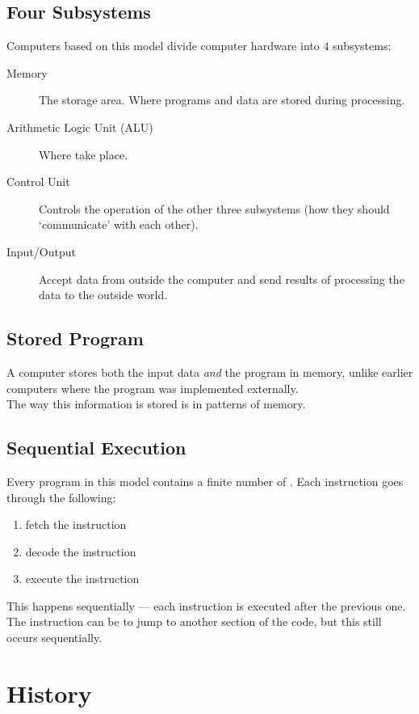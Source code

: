 \documentclass[../notes.tex]{subfiles}
\begin{document}
			\subsection{Four Subsystems}
				Computers based on this model divide computer hardware into $4$ subsystems:
				\begin{description}
					\item[Memory] The storage area. Where programs and data are stored during processing. 
					\item[Arithmetic Logic Unit (ALU)] Where  take place.
					\item[Control Unit] Controls the operation of the other three subsystems (how they should `communicate' with each other).
					\item[Input/Output] Accept data from outside the computer and send results of processing the data to the outside world. 
				\end{description}
			\subsection{Stored Program}
				A computer stores both the input data \emph{and} the program in memory, unlike earlier computers where the program was implemented externally.\\
				The way this information is stored is in  patterns of memory.
			\subsection{Sequential Execution}
				Every program in this model contains a finite number of . Each instruction goes through the following:
				\begin{enumerate}
					\item fetch the instruction
					\item decode the instruction
					\item execute the instruction
				\end{enumerate}
				This happens sequentially --- each instruction is executed after the previous one. The instruction can be to jump to another section of the code, but this still occurs sequentially.
		\pagebreak
		\section{History}
\end{document}
